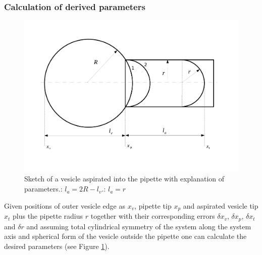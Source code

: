 \subsubsection{Calculation of derived parameters}\label{results}

\begin{figure}%
\includegraphics[width=\columnwidth]{figs/pipettesketch.pdf}%
\caption{Sketch of a vesicle aspirated into the pipette with explanation of parameters.: $l_a = 2R-l_v$.: $l_a = r$}%
\label{fig:pipettesketch}%
\end{figure}

Given positions of outer vesicle edge as $x_v$, pipette tip $x_p$ and aspirated vesicle tip $x_t$ plus the pipette radius $r$ together with their corresponding errors $\delta x_v$, $\delta x_p$, $\delta x_t$ and $\delta r$ and assuming total cylindrical symmetry of the system along the system axis and spherical form of the vesicle outside the pipette one can calculate the desired parameters (see Figure \ref{fig:pipettesketch}).

